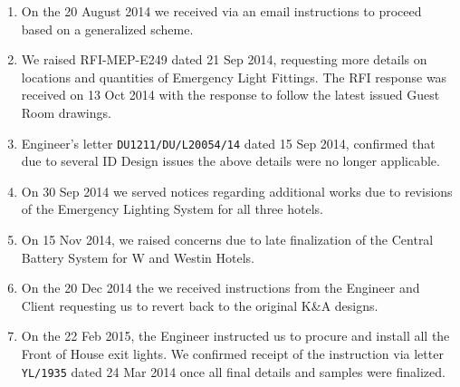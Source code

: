 \begin{enumerate}
\item On the 20 August 2014 we received via an email instructions to proceed based on a generalized scheme.
\item We raised RFI-MEP-E249 dated 21 Sep 2014, requesting more details on locations and quantities of Emergency Light Fittings. The RFI response was received on 13 Oct 2014 with the response to follow the latest issued Guest Room drawings. 
\item Engineer’s letter \texttt{DU1211/DU/L20054/14} dated 15 Sep 2014, confirmed that due to several ID Design issues the above details were no longer applicable.
\item On 30 Sep 2014 we served notices regarding additional works due to revisions of the Emergency Lighting System for all three hotels.
\item On 15 Nov 2014, we raised concerns due to late finalization of the Central Battery System for W and Westin Hotels. 
\item On the 20 Dec 2014 the we received instructions from the Engineer and Client requesting us to revert back to the original K\&A designs.
\item On the 22 Feb 2015, the Engineer instructed us to procure and install all the Front of House exit lights. We confirmed receipt of the instruction via letter \texttt{YL/1935} dated 24 Mar 2014 once all final details and samples were finalized.
\end{enumerate}










